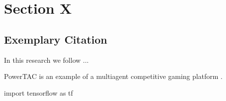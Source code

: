 \clearpage
\section{Section X}
\label{sec:Section_Name_X}

\subsection{Exemplary Citation}
\label{subsec:Section_Name_X/cite}


In this research we follow \cite{wei2016cpm}...


PowerTAC is an example of a multiagent competitive gaming platform \cite{wei2016cpm}.

\begin{python}
	import tensorflow as tf
\end{python}